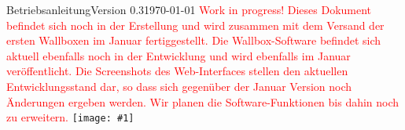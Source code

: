 \documentclass[a4paper,10pt]{article}
\title{}
\author{}
\newcommand{\gfx}[1]{\texttt{[image: \#1]}}
\begin{document}
\begin{titlepage}
	Betriebsanleitung\hfill Version 0.3\hfill \today \centering \vfill
	\colorbox{boxgray}{} \vfill \textcolor{red}{Work in progress!} \vfill
	\textcolor{red}{Dieses Dokument befindet sich noch in der Erstellung und wird zusammen mit dem
		Versand der ersten Wallboxen im Januar fertiggestellt. Die Wallbox-Software
		befindet sich aktuell ebenfalls noch in der Entwicklung und wird ebenfalls im
		Januar veröffentlicht. Die Screenshots des Web-Interfaces stellen den aktuellen
		Entwicklungsstand dar, so dass sich gegenüber der Januar Version noch Änderungen ergeben werden. Wir
		planen die Software-Funktionen bis dahin noch zu erweitern.} \vfill \gfx{./img/resized/warp_perspective_blue_ready}
\end{titlepage}
\end{document}
